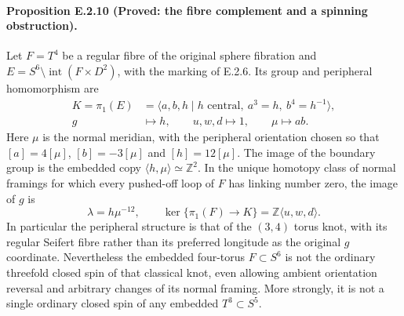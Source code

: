 \paragraph{Proposition E.2.10 (Proved: the fibre complement and a spinning obstruction).}
Let $F=T^4$ be a regular fibre of the original sphere fibration and
$E=S^6\setminus\operatorname{int}(F\times D^2)$, with the marking of
E.2.6. Its group and peripheral homomorphism are
\[
 \begin{split}
 K=\pi_1(E)&=\langle a,b,h\mid h\text{ central},\ a^3=h,
                                      \ b^4=h^{-1}\rangle,\\
 g&\longmapsto h,\qquad u,w,d\longmapsto1,
       \qquad \mu\longmapsto ab.
 \end{split}
 \tag{E.S1}
\]
Here $\mu$ is the normal meridian, with the peripheral orientation
chosen so that $[a]=4[\mu]$, $[b]=-3[\mu]$ and $[h]=12[\mu]$.
The image of the boundary group is the embedded copy
$\langle h,\mu\rangle\simeq\mathbb Z^2$. In the unique homotopy
class of normal framings for which every pushed-off loop of $F$
has linking number zero, the image of $g$ is
\[
             \lambda=h\mu^{-12},
 \qquad \ker\{\pi_1(F)\longrightarrow K\}
                 =\mathbb Z\langle u,w,d\rangle.
 \tag{E.S2}
\]
In particular the peripheral structure is that of the $(3,4)$
torus knot, with its regular Seifert fibre rather than its preferred
longitude as the original $g$ coordinate. Nevertheless the embedded
four-torus $F\subset S^6$ is not the ordinary threefold closed spin
of that classical knot, even allowing ambient orientation reversal
and arbitrary changes of its normal framing. More strongly, it is
not a single ordinary closed spin of any embedded $T^3\subset S^5$.

